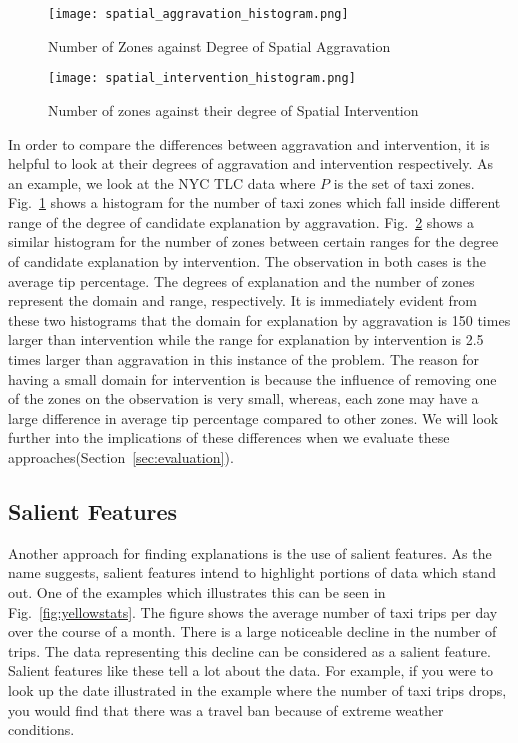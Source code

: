 \begin{figure}[ht]
\begin{center}
\texttt{[image: spatial\_aggravation\_histogram.png]}
\end{center}
\caption{Number of Zones against Degree of Spatial Aggravation}
\label{fig:spatial_aggravation_histogram}
\end{figure}

\begin{figure}[ht]
\begin{center}
\texttt{[image: spatial\_intervention\_histogram.png]}
\end{center}
\caption{Number of zones against their degree of Spatial Intervention}
\label{fig:spatial_intervention_histogram}
\end{figure}

In order to compare the differences between aggravation and intervention, it is helpful to look at their degrees of aggravation and intervention respectively. As an example, we look at the NYC TLC data where $P$ is the set of taxi zones. Fig.~\ref{fig:spatial_aggravation_histogram} shows a histogram for the number of taxi zones which fall inside different range of the degree of candidate explanation by aggravation. Fig.~\ref{fig:spatial_intervention_histogram} shows a similar histogram for the number of zones between certain ranges for the degree of candidate explanation by intervention. The observation in both cases is the average tip percentage. The degrees of explanation and the number of zones represent the domain and range, respectively. It is immediately evident from these two histograms that the domain for explanation by aggravation is 150 times larger than intervention while the range for explanation by intervention is 2.5 times larger than aggravation in this instance of the problem. The reason for having a small domain for intervention is because the influence of removing one of the zones on the observation is very small, whereas, each zone may have a large difference in average tip percentage compared to other zones. We will look further into the implications of these differences when we evaluate these approaches(Section~\ref{sec:evaluation}).

\subsection{Salient Features}
\label{sec:salient_features}

Another approach for finding explanations is the use of salient features. As the name suggests, salient features intend to highlight portions of data which stand out. One of the examples which illustrates this can be seen in Fig.~\ref{fig:yellowstats}. The figure shows the average number of taxi trips per day over the course of a month. There is a large noticeable decline in the number of trips. The data representing this decline can be considered as a salient feature. Salient features like these tell a lot about the data. For example, if you were to look up the date illustrated in the example where the number of taxi trips drops, you would find that there was a travel ban because of extreme weather conditions.

